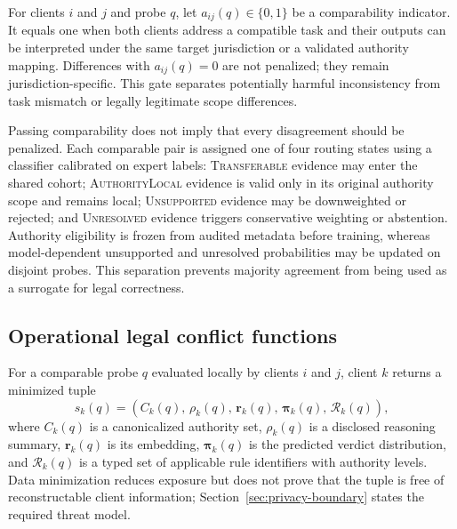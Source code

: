 \documentclass[preprint,12pt,authoryear]{elsarticle}
\newcommand{\rules}{\mathcal{R}}
\begin{document}
For clients $i$ and $j$ and probe $q$, let $a_{ij}(q)\in\{0,1\}$ be a comparability indicator. It equals one when both clients address a compatible task and their outputs can be interpreted under the same target jurisdiction or a validated authority mapping. Differences with $a_{ij}(q)=0$ are not penalized; they remain jurisdiction-specific. This gate separates potentially harmful inconsistency from task mismatch or legally legitimate scope differences.

Passing comparability does not imply that every disagreement should be penalized. Each comparable pair is assigned one of four routing states using a classifier calibrated on expert labels: \textsc{Transferable} evidence may enter the shared cohort; \textsc{AuthorityLocal} evidence is valid only in its original authority scope and remains local; \textsc{Unsupported} evidence may be downweighted or rejected; and \textsc{Unresolved} evidence triggers conservative weighting or abstention. Authority eligibility is frozen from audited metadata before training, whereas model-dependent unsupported and unresolved probabilities may be updated on disjoint probes. This separation prevents majority agreement from being used as a surrogate for legal correctness.

\subsection{Operational legal conflict functions}

For a comparable probe $q$ evaluated locally by clients $i$ and $j$, client $k$ returns a minimized tuple
\begin{equation}
    s_k(q) = \left(C_k(q),\, \rho_k(q),\, \bm{r}_k(q),\, \bm{\pi}_k(q),\, \rules_k(q)\right),
\end{equation}
where $C_k(q)$ is a canonicalized authority set, $\rho_k(q)$ is a disclosed reasoning summary, $\bm{r}_k(q)$ is its embedding, $\bm{\pi}_k(q)$ is the predicted verdict distribution, and $\rules_k(q)$ is a typed set of applicable rule identifiers with authority levels. Data minimization reduces exposure but does not prove that the tuple is free of reconstructable client information; Section~\ref{sec:privacy-boundary} states the required threat model.
\end{document}
